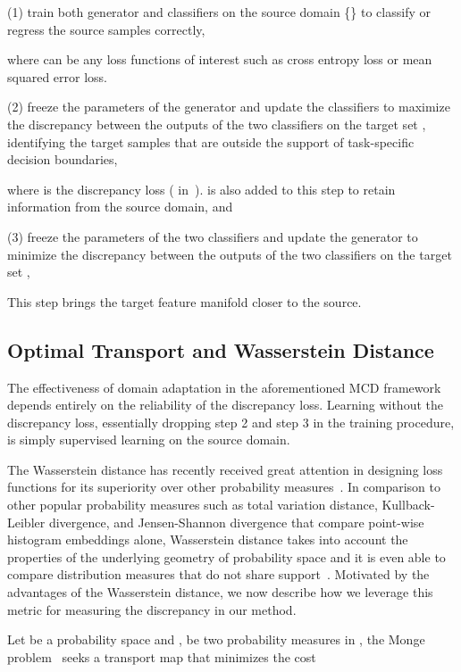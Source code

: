 \documentclass[10pt,twocolumn,letterpaper]{article}
\begin{document}
\noindent
(1) train both generator  and classifiers  on the source domain \{\} to classify or regress the source samples correctly,
 
where  can be any loss functions of interest such as cross entropy loss or mean squared error loss.

\noindent
(2) freeze the parameters of the generator  and update the classifiers  to maximize the discrepancy between the outputs of the two classifiers on the target set , identifying the target samples that are outside the support of task-specific decision boundaries, 
 
 where  is the discrepancy loss ( in~\cite{saito2017maximum}).  is also added to this step to retain information from the source domain, and

\noindent
(3) freeze the parameters of the two classifiers and update the generator  to minimize the discrepancy between the outputs of the two classifiers on the target set ,
 
 This step brings the target feature manifold closer to the source.



\subsection{Optimal Transport and Wasserstein Distance}
\label{sec:ot}
The effectiveness of domain adaptation in the aforementioned MCD framework depends entirely on the reliability of the discrepancy loss. Learning without the discrepancy loss, essentially dropping step 2 and step 3 in the training procedure, is simply supervised learning on the source domain. 

The Wasserstein distance has recently received great attention in designing loss functions for its superiority over other probability measures~\cite{wu2018wasserstein, mi2018variational}.
In comparison to other popular probability measures such as total variation distance, Kullback-Leibler divergence, and Jensen-Shannon divergence that compare point-wise histogram embeddings alone, Wasserstein distance takes into account the properties of the underlying geometry of probability space and it is even able to compare distribution measures that do not share support~\cite{arjovsky2017wasserstein}.
Motivated by the advantages of the Wasserstein distance, we now describe how we leverage this metric for measuring the discrepancy in our method.



Let  be a probability space and ,  be two probability measures in , the Monge problem~\cite{monge1781memoire} seeks a transport map  that minimizes the cost
\end{document}
